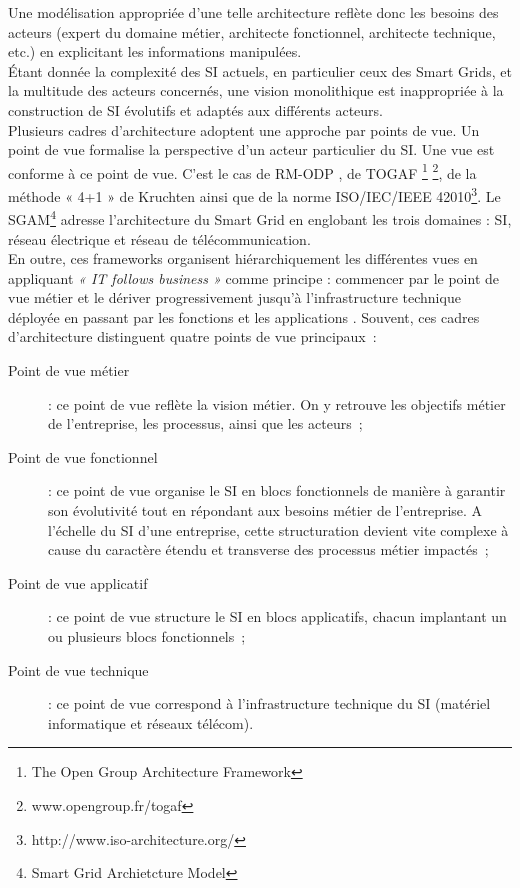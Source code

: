 Une modélisation appropriée d'une telle architecture reflète donc les besoins des acteurs (expert du domaine métier, architecte fonctionnel, architecte technique, etc.) en explicitant les informations manipulées.  
\\Étant donnée la complexité des SI actuels, en particulier ceux des Smart Grids, et la multitude des acteurs concernés, une vision monolithique est inappropriée à la construction de SI évolutifs et adaptés aux différents acteurs.
\\Plusieurs cadres d'architecture adoptent une approche par points de vue. Un point de vue formalise la perspective d'un acteur particulier du SI. Une vue est conforme à ce point de vue. C'est le cas de RM-ODP \cite{raymond1995reference}, de TOGAF \footnote{The Open Group Architecture Framework} \footnote{www.opengroup.fr/togaf}, de la méthode « 4+1 » de Kruchten \cite{kruchten19954+} ainsi que de la norme ISO/IEC/IEEE 42010\footnote{http://www.iso-architecture.org/}. Le SGAM\footnote{Smart Grid Archietcture Model} \cite{uslar2012standardization} adresse l'architecture du Smart Grid en englobant les trois domaines : SI, réseau électrique et réseau de télécommunication. 
\\En outre, ces frameworks organisent hiérarchiquement les différentes vues en appliquant \emph{« IT follows business »} comme principe : commencer par le point de vue métier et le dériver progressivement jusqu'à l'infrastructure technique déployée en passant par les fonctions et les applications \cite{winter2006essential}. 
Souvent, ces cadres d'architecture distinguent quatre points de vue principaux~:
\begin{description}
\item[Point de vue métier]  : ce point de vue reflète la vision métier. On y retrouve les objectifs métier de l'entreprise, les processus, ainsi que les acteurs~;
\item[Point de vue fonctionnel] : ce point de vue organise le SI en blocs fonctionnels de manière à garantir son évolutivité tout en répondant aux besoins métier de l'entreprise. A l'échelle du SI d'une entreprise, cette structuration devient vite complexe à cause du caractère étendu et transverse des processus métier impactés~;
\item[Point de vue applicatif] : ce point de vue structure le SI en blocs applicatifs, chacun implantant un ou plusieurs blocs fonctionnels~;
\item[Point de vue technique] : ce point de vue correspond à l'infrastructure technique du SI (matériel informatique et réseaux télécom).
\end{description}




